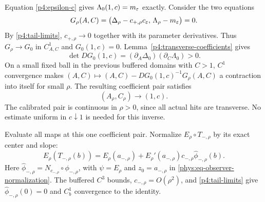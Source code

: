 Equation \eqref{p4:epsilon-c} gives
$\Lambda_0(1,c)=m_\varepsilon$ exactly.
Consider the two equations
\begin{equation}\label{p4:calibration}
 G_\rho(A,C)=
 \bigl(\Delta_\rho-c_{+,\rho}c_\varepsilon,\,
                         \Lambda_\rho-m_\varepsilon\bigr)=0.
\end{equation}
By \eqref{p4:tail-limits},
$c_{+,\rho}\to0$ together with its parameter derivatives.
Thus $G_\rho\to G_0$ in $C^1_{A,C}$ and $G_0(1,c)=0$.
Lemma~\ref{p4:transverse-coefficients} gives
\[
 \det DG_0(1,c)
 =(\partial_A\Delta_0)(\partial_C\Lambda_0)>0.
\]
On a small fixed ball in the previous buffered domains with $C>1$,
$C^1$ convergence makes
$(A,C)\mapsto(A,C)-DG_0(1,c)^{-1}G_\rho(A,C)$ a contraction into
itself for small $\rho$. The resulting coefficient pair satisfies
\begin{equation}\label{p4:AC}
 (A_\rho,C_\rho)\longrightarrow(1,c).
\end{equation}
The calibrated pair is continuous in $\rho>0$, since all actual hits
are transverse.
No estimate uniform in $c\downarrow1$ is needed for this inverse.

Evaluate all maps at this one coefficient pair. Normalize
$E_\rho\circ T_{-,\rho}$ by its exact center and slope:
\[
 E_\rho(T_{-,\rho}(b))=
 E_\rho(a_{-,\rho})+
 E_\rho'(a_{-,\rho})c_{-,\rho}\widehat\phi_{-,\rho}(b).
\]
Here $\widehat\phi_{-,\rho}=N_{c_{-,\rho}}\circ\phi_{-,\rho}$, with
$\psi=E_\rho$ and $z_0=a_{-,\rho}$ in
\eqref{phys:eq-observer-normalization}. The buffered $C^3$ bounds,
$c_{-,\rho}=O(\rho^2)$, and \eqref{p4:tail-limits} give
$\widehat\phi_{-,\rho}(0)=0$ and $C^1_b$ convergence to the identity.

